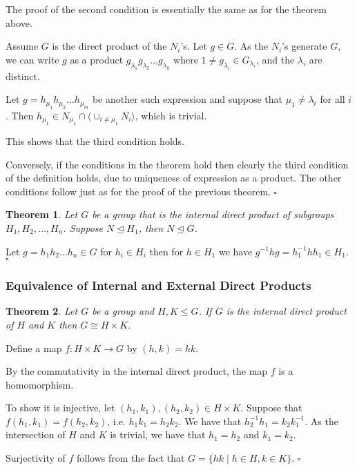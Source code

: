\documentclass[10pt]{article}
\newtheorem{theorem}{Theorem}[section]
\newenvironment{proof}[1][Proof]{\begin{trivlist}
\item[\hskip \labelsep {\itshape #1}]}{\end{trivlist}}
\begin{document}
\begin{proof}
The proof of the second condition is essentially the same as for the theorem above.

Assume $G$ is the direct product of the $N_i$'s. Let $g \in G$. As the $N_i$'s generate $G$, we can write $g$ as a product $g_{\lambda_1}g_{\lambda_2}\ldots g_{\lambda_k}$ where $1 \neq g_{\lambda_i} \in G_{\lambda_i}$, and the $\lambda_i$ are distinct. 

Let $g = h_{\mu_1}h_{\mu_2}\ldots h_{\mu_m}$ be another such expression and suppose that $\mu_1 \neq \lambda_i$ for all $i$. Then $h_{\mu_1} \in N_{\mu_1} \cap \langle \cup_{i \neq \mu_1} N_i \rangle$, which is trivial.

This shows that the third condition holds.

Conversely, if the conditions in the theorem hold then clearly the third condition of the definition holds, due to uniqueness of expression as a product. The other conditions follow just as for the proof of the previous theorem. $\square$
\end{proof}

\begin{theorem}
Let $G$ be a group that is the internal direct product of subgroups $H_1, H_2, \ldots, H_n$. Suppose $N \mathrel{\unlhd} H_1$, then $N \mathrel{\unlhd} G$.
\end{theorem}

\begin{proof}
Let $g = h_1h_2\ldots h_n \in G$ for $h_i \in H_i$ then for $h \in H_1$ we have $g^{-1}hg = h_1^{-1}hh_1 \in H_1$. $\square$ 
\end{proof}

\subsubsection{Equivalence of Internal and External Direct Products}

\begin{theorem}
Let $G$ be a group and $H, K \leq G$. If $G$ is the internal direct product of $H$ and $K$ then $G \cong H\times K$.
\end{theorem}

\begin{proof}
Define a map $f : H\times K \to G$ by $(h, k) = hk$.

By the commutativity in the internal direct product, the map $f$ is a homomorphism.

To show it is injective, let $(h_1, k_1), (h_2, k_2) \in H\times K$. Suppose that $f(h_1, k_1) = f(h_2, k_2)$, i.e. $h_1k_1 = h_2k_2$. We have that $h_2^{-1}h_1 = k_2k_1^{-1}$. As the intersection of $H$ and $K$ is trivial, we have that $h_1 = h_2$ and $k_1 = k_2$.

Surjectivity of $f$ follows from the fact that $G = \{hk \;|\; h \in H, k \in K\}$. $\square$
\end{proof}
\end{document}
